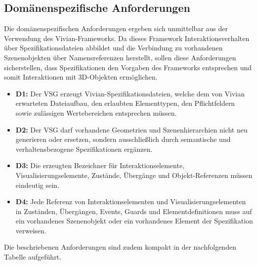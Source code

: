 \subsection{Domänenspezifische Anforderungen}
Die domänenspezifischen Anforderungen ergeben sich unmittelbar aus der Verwendung des Vivian-Frameworks. Da dieses Framework Interaktionsverhalten über Spezifikationsdateien abbildet und die Verbindung zu vorhandenen Szenenobjekten über Namensreferenzen herstellt, sollen diese Anforderungen sicherstellen, dass Spezifikationen den Vorgaben des Frameworks entsprechen und somit Interaktionen mit 3D-Objekten ermöglichen.

\begin{itemize}
	\item \textbf{D1:} Der VSG erzeugt Vivian-Spezifikationsdateien, welche dem von Vivian erwarteten Dateiaufbau, den erlaubten Elementtypen, den Pflichtfeldern sowie zulässigen Wertebereichen entsprechen müssen.

	\item \textbf{D2:} Der VSG darf vorhandene Geometrien und Szenenhierarchien nicht neu generieren oder ersetzen, sondern ausschließlich durch semantische und verhaltensbezogene Spezifikationen ergänzen.

	\item \textbf{D3:} Die erzeugten Bezeichner für Interaktionselemente, Visualisierungselemente, Zustände, Übergänge und Objekt-Referenzen müssen eindeutig sein.

	\item \textbf{D4:} Jede Referenz von Interaktionselementen und Visualisierungselementen in Zuständen, Übergängen, Events, Guards und Elementdefinitionen muss auf ein vorhandenes Szenenobjekt oder ein vorhandenes Element der Spezifikation verweisen.

\end{itemize}



Die beschriebenen Anforderungen sind zudem kompakt in der nachfolgenden Tabelle aufgeführt.

